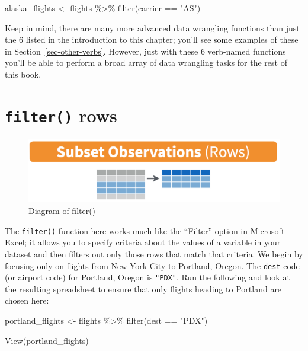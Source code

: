 \documentclass[
  letterpaper,
  DIV=11,
  numbers=noendperiod]{scrreprt}
\newenvironment{Shaded}{\begin{snugshade}}{\end{snugshade}}
\newcommand{\FunctionTok}[1]{\textcolor[rgb]{0.28,0.35,0.67}{#1}}
\newcommand{\NormalTok}[1]{\textcolor[rgb]{0.00,0.23,0.31}{#1}}
\newcommand{\OtherTok}[1]{\textcolor[rgb]{0.00,0.23,0.31}{#1}}
\newcommand{\SpecialCharTok}[1]{\textcolor[rgb]{0.37,0.37,0.37}{#1}}
\newcommand{\StringTok}[1]{\textcolor[rgb]{0.13,0.47,0.30}{#1}}
\theoremstyle{definition}
\theoremstyle{remark}
\begin{document}
\begin{Shaded}
\begin{Highlighting}[]
\NormalTok{alaska\_flights }\OtherTok{\textless{}{-}}\NormalTok{ flights }\SpecialCharTok{\%\textgreater{}\%} 
  \FunctionTok{filter}\NormalTok{(carrier }\SpecialCharTok{==} \StringTok{"AS"}\NormalTok{)}
\end{Highlighting}
\end{Shaded}

Keep in mind, there are many more advanced data wrangling functions than
just the 6 listed in the introduction to this chapter; you'll see some
examples of these in Section~\ref{sec-other-verbs}. However, just with
these 6 verb-named functions you'll be able to perform a broad array of
data wrangling tasks for the rest of this book.

\hypertarget{sec-filter}{%
\section{\texorpdfstring{\texttt{filter()}
rows}{filter() rows}}\label{sec-filter}}

\begin{figure}

{\centering \includegraphics{images/filter.png}

}

\caption{\label{fig-filter}Diagram of filter()}

\end{figure}

The \texttt{filter()} function here works much like the ``Filter''
option in Microsoft Excel; it allows you to specify criteria about the
values of a variable in your dataset and then filters out only those
rows that match that criteria. We begin by focusing only on flights from
New York City to Portland, Oregon. The \texttt{dest} code (or airport
code) for Portland, Oregon is \texttt{"PDX"}. Run the following and look
at the resulting spreadsheet to ensure that only flights heading to
Portland are chosen here:

\begin{Shaded}
\begin{Highlighting}[]
\NormalTok{portland\_flights }\OtherTok{\textless{}{-}}\NormalTok{ flights }\SpecialCharTok{\%\textgreater{}\%} 
  \FunctionTok{filter}\NormalTok{(dest }\SpecialCharTok{==} \StringTok{"PDX"}\NormalTok{)}

\FunctionTok{View}\NormalTok{(portland\_flights)}
\end{Highlighting}
\end{Shaded}
\end{document}
